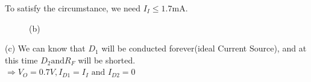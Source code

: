 \documentclass[a4paper,11pt,UTF8]{article}
\begin{document}
To satisfy the circumstance, we need $I_I\leq1.7$mA.\\
\begin{figure}[H]
	\centering  %
	\caption{(b)}
\end{figure}
\noindent(c)
We can know that $D_1$ will be conducted forever(ideal Current Source), and at this time $D_2 \text{and} R_F$ will be shorted.\\
$\Rightarrow V_O = 0.7 V, I_{D1} = I_I \text{ and } I_{D2} = 0$\\
\end{document}
